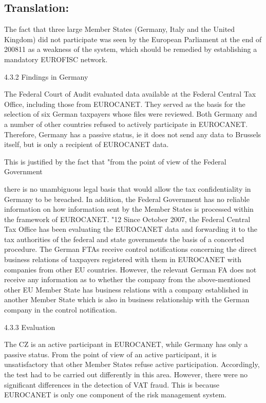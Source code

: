 \documentclass[10pt]{article}
\begin{document}
\pagebreak

\subsection*{Translation:}

The fact that three large Member States (Germany, Italy and the United Kingdom) did not participate was seen by the European Parliament at the end of 200811 as a weakness of the system, which should be remedied by establishing a mandatory EUROFISC network.


4.3.2 Findings in Germany

The Federal Court of Audit evaluated data available at the Federal Central Tax Office, including those from EUROCANET.
They served as the basis for the selection of six German taxpayers whose files were reviewed.
Both Germany and a number of other countries refused to actively participate in EUROCANET.
Therefore, Germany has a passive status, ie it does not send any data to Brussels itself, but is only a recipient of EUROCANET data.


This is justified by the fact that "from the point of view of the Federal Government

there is no unambiguous legal basis that would allow the tax confidentiality in Germany to be breached.
In addition, the Federal Government has no reliable information on how information sent by the Member States is processed within the framework of EUROCANET. "12 Since October 2007, the Federal Central Tax Office has been evaluating the EUROCANET data and forwarding it to the tax authorities of the federal and state governments the basis of a concerted procedure.
The German FTAs receive control notifications concerning the direct business relations of taxpayers registered with them in EUROCANET with companies from other EU countries.
However, the relevant German FA does not receive any information as to whether the company from the above-mentioned other EU Member State has business relations with a company established in another Member State which is also in business relationship with the German company in the control notification.


4.3.3 Evaluation

The CZ is an active participant in EUROCANET, while Germany has only a passive status.
From the point of view of an active participant, it is unsatisfactory that other Member States refuse active participation.
Accordingly, the test had to be carried out differently in this area.
However, there were no significant differences in the detection of VAT fraud. This is because EUROCANET is only one component of the risk management system.
\end{document}
